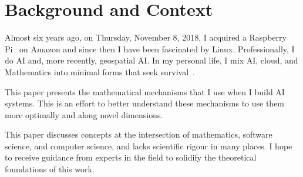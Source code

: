 \section{Background and Context}

Almost six years ago, on Thursday, November 8, 2018, I acquired a Raspberry Pi~ on Amazon and since then I have been fascinated by Linux. Professionally, I do AI and, more recently, geospatial AI. In my personal life, I mix AI, cloud, and Mathematics into minimal forms that seek survival~.

This paper presents the mathematical mechanisms that I use when I build AI systems. This is an effort to better understand these mechanisms to use them more optimally and along novel dimensions.

This paper discusses concepts at the intersection of mathematics, software science, and computer science, and lacks scientific rigour in many places. I hope to receive guidance from experts in the field to solidify the theoretical foundations of this work.